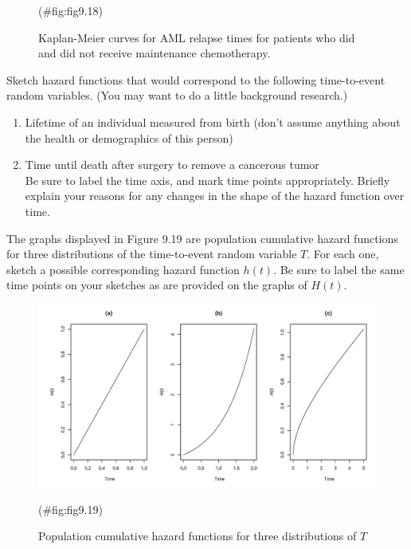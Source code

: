 \documentclass[
]{report}
\begin{document}
\begin{list}{E.}{ \setlength{\itemsep}{1.2em}}
\begin{figure}
{}

\caption{Kaplan-Meier curves for AML relapse times for patients who did and did not receive maintenance chemotherapy.}(\#fig:fig9.18)
\end{figure}

  \item Sketch hazard functions that would correspond to the following time-to-event random variables. (You may want to do a little background research.)
  \begin{enumerate}
    \item Lifetime of an individual measured from birth (don’t assume anything about the health or demographics of this person)
    \item Time until death after surgery to remove a cancerous tumor\\
    Be sure to label the time axis, and mark time points appropriately. Briefly explain your reasons for any changes in the shape of the hazard function over time.
  \end{enumerate}

  \item The graphs displayed in Figure 9.19 are population cumulative hazard functions for three distributions of the time-to-event random variable $T$. For each one, sketch a possible corresponding hazard function $h(t)$. Be sure to label the same time points on your sketches as are provided on the graphs of $H(t)$.

\begin{figure}

{\centering \includegraphics[width=1\linewidth]{docs/Fig9_19} 

}

\caption{Population cumulative hazard functions for three distributions of $T$}(\#fig:fig9.19)
\end{figure}


\end{list}
\end{document}
